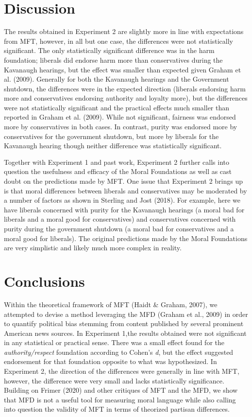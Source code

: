 \documentclass[
  english,
  man,floatsintext]{apa6}
\begin{document}
\hypertarget{discussion-1}{%
\section{Discussion}\label{discussion-1}}

The results obtained in Experiment 2 are slightly more in line with expectations from MFT, however, in all but one case, the differences were not statistically significant. The only statistically significant difference was in the harm foundation; liberals did endorse harm more than conservatives during the Kavanaugh hearings, but the effect was smaller than expected given Graham et al. (2009). Generally for both the Kavanaugh hearings and the Government shutdown, the differences were in the expected direction (liberals endorsing harm more and conservatives endorsing authority and loyalty more), but the differences were not statistically significant and the practical effects much smaller than reported in Graham et al. (2009). While not significant, fairness was endorsed more by conservatives in both cases. In contrast, purity was endorsed more by conservatives for the government shutdown, but more by liberals for the Kavanaugh hearing though neither difference was statistically significant.

Together with Experiment 1 and past work, Experiment 2 further calls into question the usefulness and efficacy of the Moral Foundations as well as cast doubt on the predictions made by MFT. One issue that Experiment 2 brings up is that moral differences between liberals and conservatives may be moderated by a number of factors as shown in Sterling and Jost (2018). For example, here we have liberals concerned with purity for the Kavanaugh hearings (a moral bad for liberals and a moral good for conservatives) and conservatives concerned with purity during the government shutdown (a moral bad for conservatives and a moral good for liberals). The original predictions made by the Moral Foundations are very simplistic and likely much more complex in reality.

\hypertarget{conclusions}{%
\section{Conclusions}\label{conclusions}}

Within the theoretical framework of MFT (Haidt \& Graham, 2007), we attempted to devise a method leveraging the MFD (Graham et al., 2009) in order to quantify political bias stemming from content published by several prominent American news sources. In Experiment 1,the results obtained were not significant in any statistical or practical sense. There was a small effect found for the \emph{authority/respect} foundation according to Cohen's \emph{d}, but the effect suggested endorsement for that foundation opposite to what was hypothesized. In Experiment 2, the direction of the differences were generally in line with MFT, however, the difference were very small and lacks statistically significance. Building on Frimer (2020) and other critiques of MFT and the MFD, we show that MFD is not a useful tool for measuring moral language while also calling into question the validity of MFT in terms of theorized partisan differences.
\end{document}
